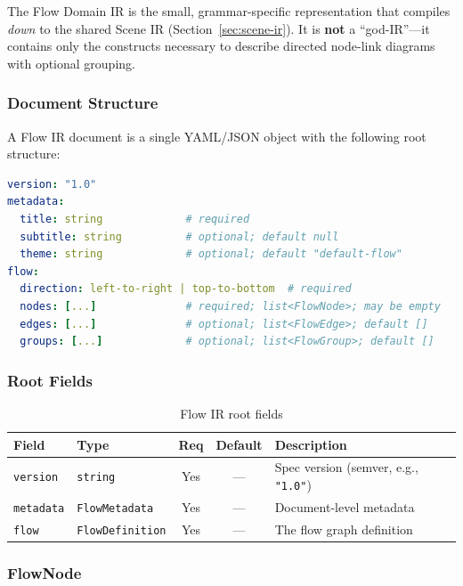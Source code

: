 The Flow Domain IR is the small, grammar-specific representation that compiles \emph{down} to the shared Scene IR (Section~\ref{sec:scene-ir}). It is \textbf{not} a ``god-IR''---it contains only the constructs necessary to describe directed node-link diagrams with optional grouping.

\subsubsection{Document Structure}

A Flow IR document is a single YAML/JSON object with the following root structure:

\begin{lstlisting}[language=yaml,caption={Flow IR root document structure}]
version: "1.0"
metadata:
  title: string             # required
  subtitle: string          # optional; default null
  theme: string             # optional; default "default-flow"
flow:
  direction: left-to-right | top-to-bottom  # required
  nodes: [...]              # required; list<FlowNode>; may be empty
  edges: [...]              # optional; list<FlowEdge>; default []
  groups: [...]             # optional; list<FlowGroup>; default []
\end{lstlisting}

\subsubsection{Root Fields}

\begin{table}[h]
\centering
\small
\begin{tabular}{llccp{4.8cm}}
\toprule
\textbf{Field} & \textbf{Type} & \textbf{Req} & \textbf{Default} & \textbf{Description} \\
\midrule
\texttt{version} & \texttt{string} & Yes & --- & Spec version (semver, e.g., \texttt{"1.0"}) \\
\texttt{metadata} & \texttt{FlowMetadata} & Yes & --- & Document-level metadata \\
\texttt{flow} & \texttt{FlowDefinition} & Yes & --- & The flow graph definition \\
\bottomrule
\end{tabular}
\caption{Flow IR root fields}
\label{tab:flow-root-fields}
\end{table}

\subsubsection{FlowNode}
\label{sec:flow-node}

